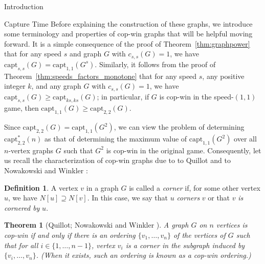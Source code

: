 \documentclass[12pt]{amsart}
\newcommand{\comment}[1]{\textcolor{red}{#1}}
\newtheorem{theorem}[lemma]{Theorem}
\theoremstyle{definition}
\newtheorem{definition}[lemma]{Definition}
\newcommand{\speed}[1]{c_{#1,#1}}
\newcommand{\capt}[1]{\mathrm{capt}_{#1,#1}}
\begin{document}
\begin{section}{Introduction}
\begin{section}{Capture Time}
Before explaining the construction of these graphs, we introduce some terminology and properties of cop-win graphs that will be helpful moving forward. It is a simple consequence of the proof of Theorem~\ref{thm:graphpower} that for any speed $s$ and graph $G$ with $\speed{s}(G)=1$, we have $\capt{s}(G)=\capt{1}(G^s)$.  Similarly, it follows from the proof of Theorem~\ref{thm:speeds_factors_monotone} that for any speed $s$, any positive integer $k$, and any graph $G$ with $\speed{s}(G)=1$, we have $\capt{s}(G)\ge\capt{ks}(G)$; in particular, if $G$ is cop-win in the speed-$(1,1)$ game, then $\capt{1}(G) \ge \capt{2}(G)$. 

Since $\capt{2}(G) = \capt{1}(G^2)$, we can view the problem of determining $\capt{2}^*(n)$ as that of determining the maximum value of $\capt{1}(G^2)$ over all $n$-vertex graphs $G$ such that $G^2$ is cop-win in the original game.  Consequently, let us recall the characterization of cop-win graphs due to to Quillot \cite{Qui78} and to Nowakowski and Winkler \cite{NW83}:

\begin{definition}
   A vertex $v$ in a graph $G$ is called a \textit{corner} if, for some other vertex $u$, we have $N[u]\supseteq N[v]$.  In this case, we say that $u$ \textit{corners} $v$ or that $v$ \textit{is cornered by} $u$.
\end{definition}

\begin{theorem}[Quillot\cite{Qui78}; Nowakowski and Winkler \cite{NW83}]\label{thm:copwin}
    A graph $G$ on $n$ vertices is cop-win if and only if there is an ordering $\{v_1,\dots,v_n\}$ of the vertices of $G$ such that for all $i \in \{1, \dots, n-1\}$, vertex $v_i$ is a corner in the subgraph induced by $\{v_i,\dots,v_n\}$.  (When it exists, such an ordering is known as a \textit{cop-win ordering}.)
\end{theorem}


\end{section}
\end{section}
\end{document}
